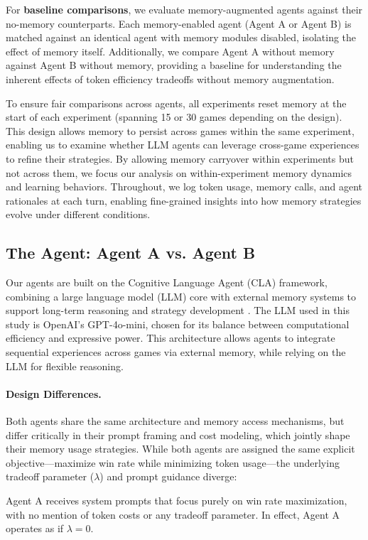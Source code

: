 \documentclass[10pt]{article}
\begin{document}
For \textbf{baseline comparisons}, we evaluate memory-augmented agents against their no-memory counterparts. Each memory-enabled agent (Agent A or Agent B) is matched against an identical agent with memory modules disabled, isolating the effect of memory itself. Additionally, we compare Agent A without memory against Agent B without memory, providing a baseline for understanding the inherent effects of token efficiency tradeoffs without memory augmentation.

To ensure fair comparisons across agents, all experiments reset memory at the start of each experiment (spanning 15 or 30 games depending on the design). This design allows memory to persist across games within the same experiment, enabling us to examine whether LLM agents can leverage cross-game experiences to refine their strategies. By allowing memory carryover within experiments but not across them, we focus our analysis on within-experiment memory dynamics and learning behaviors. Throughout, we log token usage, memory calls, and agent rationales at each turn, enabling fine-grained insights into how memory strategies evolve under different conditions.

\subsection{The Agent: Agent A vs. Agent B}
Our agents are built on the Cognitive Language Agent (CLA) framework, combining a large language model (LLM) core with external memory systems to support long-term reasoning and strategy development \cite{sumers2024cognitivearchitectureslanguageagents}. The LLM used in this study is OpenAI's GPT-4o-mini, chosen for its balance between computational efficiency and expressive power. This architecture allows agents to integrate sequential experiences across games via external memory, while relying on the LLM for flexible reasoning.

\paragraph{Design Differences.}
Both agents share the same architecture and memory access mechanisms, but differ critically in their prompt framing and cost modeling, which jointly shape their memory usage strategies. While both agents are assigned the same explicit objective—maximize win rate while minimizing token usage—the underlying tradeoff parameter ($\lambda$) and prompt guidance diverge:

Agent A receives system prompts that focus purely on win rate maximization, with no mention of token costs or any tradeoff parameter. In effect, Agent A operates as if $\lambda = 0$.
\end{document}
